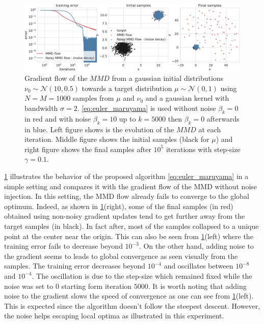 \begin{figure}[ht]
	\centering
	\includegraphics[width=0.8\linewidth]{figures/Gaussians_error_4}
	\caption{Gradient flow of the $MMD$ from a gaussian initial distributions $\nu_0\sim \mathcal{N}(10,0.5)$  towards a target distribution $\mu\sim \mathcal{N}(0,1)$ using $N=M=1000$ samples from $\mu$ and $\nu_0$ and a gaussian kernel with bandwidth $\sigma = 2 $. \cref{eq:euler_maruyama} is used 
	without noise $\beta_k = 0$ in red and  with noise $\beta_k = 10$ up to $k=5000$ then $\beta_k = 0$ afterwards in blue. 
	Left figure shows is the evolution of the $MMD$ at each iteration. Middle figure shows the initial samples (black for $\mu$) and right figure shows the final samples after $10^5$ iterations with step-size $\gamma = 0.1$.}
	\label{fig:experiments}
\end{figure}
\cref{fig:experiments} illustrates the behavior of the proposed algorithm \cref{eq:euler_maruyama} in a simple setting and compares it with the gradient flow of the MMD without noise injection. In this setting, the MMD flow already fails to converge to the global optimum. Indeed, as shown in \cref{fig:experiments}(right), some of the final samples (in red) obtained using non-noisy gradient updates tend to get further away from the target samples (in black). In fact after, most of the samples collapsed to a unique point at the center near the origin. This can also be seen from \cref{fig:experiments}(left) where the training error fails to decrease beyond $10^{-3}$. On the other hand, adding noise to the gradient seems to leads to global convergence as seen visually from the samples. The training error decreases beyond $10^{-4}$ and oscillates between $10^{-8}$ and $10^{-4}$. The oscillation is due to the step-size which remained fixed while the noise was set to $0$ starting form iteration $5000$. It is worth noting that adding noise to the gradient slows the speed of convergence as one can see from \cref{fig:experiments}(left). This is expected since the algorithm doesn't follow the steepest descent. However, the noise helps escaping local optima as  illustrated in this experiment.
